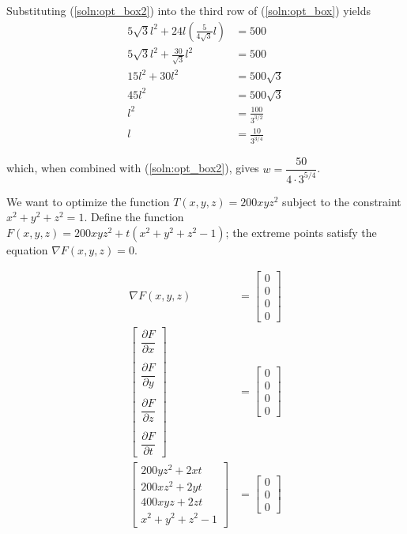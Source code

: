 Substituting (\ref{soln:opt_box2}) into the third row of (\ref{soln:opt_box})
yields
\begin{align*}
 5\sqrt{3}l^2 + 24l(\frac{5}{4\sqrt{3}}l) &= 500 \\
 5\sqrt{3}l^2 + \frac{30}{\sqrt{3}}l^2 &= 500 \\
 15l^2 + 30l^2 &= 500\sqrt{3} \\
 45l^2 &= 500\sqrt{3} \\
 l^2 &= \frac{100}{3^{3/2}} \\
 l &= \frac{10}{3^{3/4}}
\end{align*}

which, when combined with (\ref{soln:opt_box2}), gives
$w = \dfrac{50}{4\cdot3^{5/4}}$.

\item

We want to optimize the function $T(x,y,z) = 200xyz^2$ subject to the
constraint $x^2+y^2+z^2 = 1$.  Define the function
$F(x,y,z) = 200xyz^2 + t(x^2+y^2+z^2-1)$; the extreme points satisfy the
equation $\nabla F(x,y,z) = 0$.

\begin{align}
 \nabla F(x,y,z) &= \begin{bmatrix} 0 \\ 0 \\ 0 \\ 0 \end{bmatrix} \nonumber \\
 \begin{bmatrix}
  \dfrac{\partial F}{\partial x} \\ \\
  \dfrac{\partial F}{\partial y} \\ \\
  \dfrac{\partial F}{\partial z} \\ \\
  \dfrac{\partial F}{\partial t}
 \end{bmatrix} &= \begin{bmatrix} 0 \\ 0 \\ 0 \\ 0 \end{bmatrix} \nonumber \\
 \begin{bmatrix}
  200yz^2 + 2xt \\
  200xz^2 + 2yt \\
  400xyz + 2zt \\
  x^2 + y^2 + z^2 - 1
 \end{bmatrix} &= \begin{bmatrix} 0 \\ 0 \\ 0 \end{bmatrix} \label{soln:opt_heat}
\end{align}

